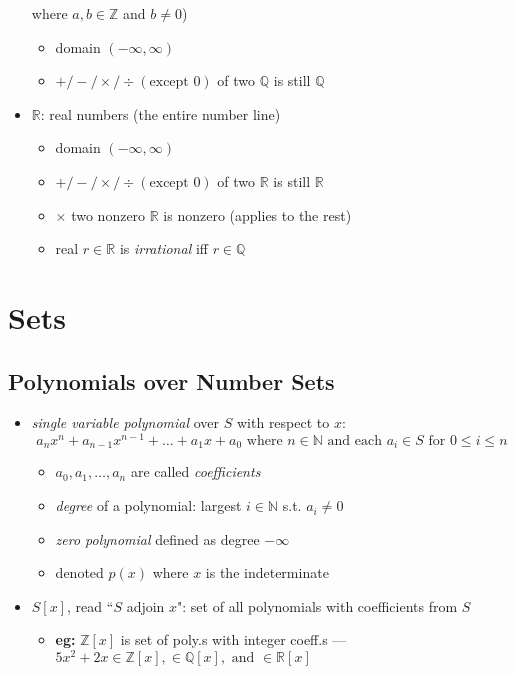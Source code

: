 \documentclass[11pt]{article}
\theoremstyle{definition}
\newcommand{\addsection}[1]{\addcontentsline{toc}{section}{#1}\section*{#1}}
\newcommand{\bb}[1]{\mathbb{#1}}
\begin{document}
\begin{itemize}
    where $a,b \in \bb{Z}$ and $b \neq 0$)
    \begin{itemize}
        \item domain $(-\infty,\infty)$
        \item $+/-/\times/\div (\text{except 0})$ of two $\bb{Q}$ is still $\bb{Q}$
    \end{itemize}
    \item $\bb{R}$: real numbers (the entire number line)
    \begin{itemize}
        \item domain $(-\infty,\infty)$
        \item $+/-/\times/\div (\text{except 0})$ of two $\bb{R}$ is still $\bb{R}$
        \item $\times$ two nonzero $\bb{R}$ is nonzero (applies to the rest)
        \item real $r\in \bb{R}$ is \emph{irrational} iff $r\in\bb{Q}$
    \end{itemize}
\end{itemize}

\newpage
\addsection{Sets}
\subsection*{Polynomials over Number Sets}
\begin{itemize}
    \item \emph{single variable polynomial} over $S$ with respect to $x$:
    \[ a_nx^n + a_{n-1}x^{n-1} + \dots + a_1x + a_0 
    \text{ where } n\in\bb{N} \text{ and each } a_i\in S \text{ for } 0\le i \le n \]
    \begin{itemize}
        \item $a_0,a_1,\dots,a_n$ are called \emph{coefficients}
        \item \emph{degree} of a polynomial: largest $i\in\bb{N}$ s.t. $a_i\ne0$
        \item \emph{zero polynomial} defined as degree $-\infty$
        \item denoted $p(x)$ where $x$ is the indeterminate
    \end{itemize}
    \item $S[x]$, read ``$S$ adjoin $x$":
    set of all polynomials with coefficients from $S$
    \begin{itemize}
        \item \textbf{eg:} $\bb{Z}[x]$ is set of poly.s with integer coeff.s --- 
        $5x^2 +2x \in \bb{Z}[x], \in \bb{Q}[x], \text{ and }\in \bb{R}[x]$
    \end{itemize}
\end{itemize}
\end{document}
